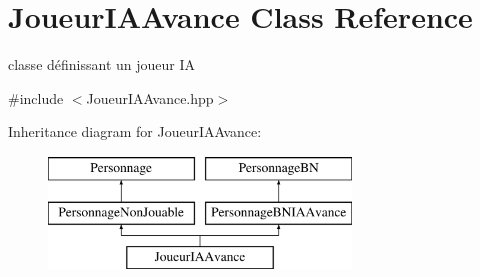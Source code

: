 \hypertarget{classJoueurIAAvance}{\section{Joueur\-I\-A\-Avance Class Reference}
\label{classJoueurIAAvance}
}


classe définissant un joueur I\-A  




{\ttfamily \#include $<$Joueur\-I\-A\-Avance.\-hpp$>$}

Inheritance diagram for Joueur\-I\-A\-Avance\-:\begin{figure}[H]
\begin{center}
\leavevmode
\includegraphics[height=3.000000cm]{classJoueurIAAvance}
\end{center}
\end{figure}
